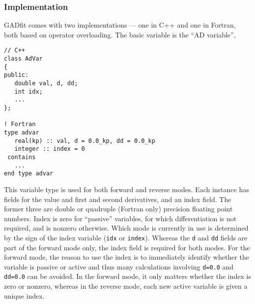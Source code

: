 \documentclass{article}
\begin{document}
\subsubsection{Implementation}

GADfit comes with two implementations --- one in C++ and one in Fortran, both based on operator overloading. The basic variable is the ``AD variable'',
\begin{verbatim}
// C++
class AdVar
{
public:
   double val, d, dd;
   int idx;
   ...
};

! Fortran
type advar
   real(kp) :: val, d = 0.0_kp, dd = 0.0_kp
   integer :: index = 0
 contains
   ...
end type advar
\end{verbatim}
This variable type is used for both forward and reverse modes. Each instance has fields for the value and first and second derivatives, and an index field. The former three are double or quadruple (Fortran only) precision floating point numbers. Index is zero for ``passive'' variables, for which differentiation is not required, and is nonzero otherwise. Which mode is currently in use is determined by the sign of the index variable (\texttt{idx}  or \texttt{index}). Whereas the \texttt{d} and \texttt{dd} fields are part of the forward mode only, the index field is required for both modes. For the forward mode, the reason to use the index is to immediately identify whether the variable is passive or active and thus many calculations involving \texttt{d=0.0} and \texttt{dd=0.0} can be avoided. In the forward mode, it only matters whether the index is zero or nonzero, whereas in the reverse mode, each new active variable is given a unique index.
\end{document}
